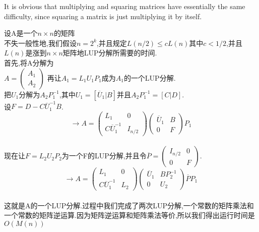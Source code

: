 \documentclass[a4paper, justified]{tufte-handout}
\begin{document}
\begin{problem}[TC 28.2-1]
\end{problem}

\begin{solution}
  It is obvious that multiplying and squaring matrices have essentially the same difficulty, since squaring a matrix is just multiplying it by itself.
\end{solution}

\begin{problem}[TC 28.2-2]
\end{problem}

\begin{solution}
  设A是一个$n \times n$的矩阵\\
  不失一般性地,我们假设$n=2^k$,并且规定$L(n/2)\leq cL(n)$其中$c<1/2$,并且$L(n)$是涨到$n \times n$矩阵地LUP分解所需要的时间.\\
  首先,将A分解为\\
  $A=\left(\begin{array}{ccc}
        A_1 \\
        A_2
      \end{array}
    \right)$
  再让$A_1=L_1U_1P_1$成为$A_1$的一个LUP分解.\\
  把$U_1$分解为$A_2P_1^{-1}$,其中$U_1=[\overline{U}_1|B]$并且$A_2P_1^{-1}=[C|D]$.\\
  设$F=D-C\overline{U}_1^{-1}B$. \\
  $$\rightarrow
    A=\left(\begin{array}{ccc}
        L_1                  & 0       \\
        C\overline{U}_1^{-1} & I_{n/2}
      \end{array}
    \right)
    \left(\begin{array}{ccc}
        \overline{U}_1 & B \\
        0              & F
      \end{array}
    \right)P_1$$\\
  现在让$F=L_2U_2P_2$为一个F的LUP分解,并且令$\overline{P}=\left(\begin{array}{ccc}
        I_{n/2} & 0 \\
        0       & F
      \end{array}\right)$.
  $$\rightarrow
    A=\left(\begin{array}{ccc}
        L_1                  & 0   \\
        C\overline{U}_1^{-1} & L_2
      \end{array}
    \right)
    \left(\begin{array}{ccc}
        \overline{U}_1 & BP_2^{-1} \\
        0              & U_2
      \end{array}
    \right)\overline{P}P_1$$\\
  这就是A的一个LUP分解.过程中我们完成了两次LUP分解,一个常数的矩阵乘法和一个常数的矩阵逆运算.因为矩阵逆运算和矩阵乘法等价,所以我们得出运行时间是$O(M(n))$

\end{solution}
\end{document}
